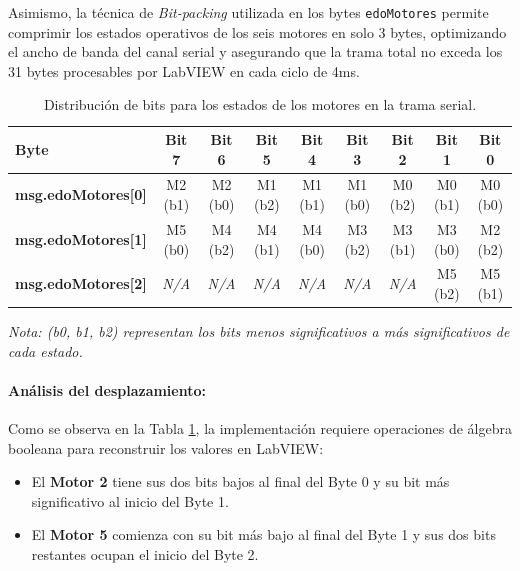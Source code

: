 Asimismo, la técnica de \textit{Bit-packing} utilizada en los bytes \texttt{edoMotores} permite comprimir los estados operativos de los seis motores en solo 3 bytes, optimizando el ancho de banda del canal serial y asegurando que la trama total no exceda los 31 bytes procesables por LabVIEW en cada ciclo de 4ms.

\begin{table}[h!]
	\centering
	\small
	\renewcommand{\arraystretch}{1.5}
	\caption{Distribución de bits para los estados de los motores en la trama serial.}
	\label{tab:bit_packing_motores}
	\begin{tabularx}{\textwidth}{|l|c|c|c|c|c|c|c|c|}
		\hline
		\rowcolor{green!20}
		\textbf{Byte} & \textbf{Bit 7} & \textbf{Bit 6} & \textbf{Bit 5} & \textbf{Bit 4} & \textbf{Bit 3} & \textbf{Bit 2} & \textbf{Bit 1} & \textbf{Bit 0} \\ \hline
		\textbf{msg.edoMotores[0]} & \cellcolor{blue!10}M2 (b1) & \cellcolor{blue!10}M2 (b0) & \cellcolor{orange!10}M1 (b2) & \cellcolor{orange!10}M1 (b1) & \cellcolor{orange!10}M1 (b0) & \cellcolor{green!10}M0 (b2) & \cellcolor{green!10}M0 (b1) & \cellcolor{green!10}M0 (b0) \\ \hline
		\textbf{msg.edoMotores[1]} & \cellcolor{red!10}M5 (b0) & \cellcolor{purple!10}M4 (b2) & \cellcolor{purple!10}M4 (b1) & \cellcolor{purple!10}M4 (b0) & \cellcolor{yellow!10}M3 (b2) & \cellcolor{yellow!10}M3 (b1) & \cellcolor{yellow!10}M3 (b0) & \cellcolor{blue!10}M2 (b2) \\ \hline
		\textbf{msg.edoMotores[2]} & \textit{N/A} & \textit{N/A} & \textit{N/A} & \textit{N/A} & \textit{N/A} & \textit{N/A} & \cellcolor{red!10}M5 (b2) & \cellcolor{red!10}M5 (b1) \\ \hline
	\end{tabularx}
	\begin{center}
		\footnotesize \textit{Nota: (b0, b1, b2) representan los bits menos significativos a más significativos de cada estado.}
	\end{center}
\end{table}

\paragraph{Análisis del desplazamiento:}
Como se observa en la Tabla \ref{tab:bit_packing_motores}, la implementación requiere operaciones de álgebra booleana para reconstruir los valores en LabVIEW:
\begin{itemize}
	\item El \textbf{Motor 2} tiene sus dos bits bajos al final del Byte 0 y su bit más significativo al inicio del Byte 1.
	\item El \textbf{Motor 5} comienza con su bit más bajo al final del Byte 1 y sus dos bits restantes ocupan el inicio del Byte 2.
\end{itemize}

